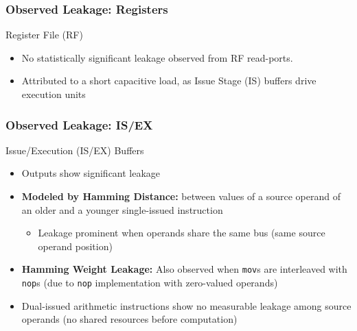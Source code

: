 \begin{frame}
    \frametitle{Observed Leakage: Registers}
    \begin{block}{Register File (RF)}
        \begin{itemize}
            \item No statistically significant leakage observed from RF read-ports.
            \item Attributed to a short capacitive load, as Issue Stage (IS) buffers drive execution units
        \end{itemize}
    \end{block}
\end{frame}

\begin{frame}
    \frametitle{Observed Leakage: IS/EX}
    \begin{block}{Issue/Execution (IS/EX) Buffers}
        \begin{itemize}
            \item Outputs show significant leakage
            \item \textbf{Modeled by Hamming Distance:} between values of a source operand of an older and a younger single-issued instruction
                \begin{itemize}
                    \item Leakage prominent when operands share the same bus (same source operand position)
                \end{itemize}
            \item \textbf{Hamming Weight Leakage:} Also observed when \texttt{mov}s are interleaved with \texttt{nop}s (due to \texttt{nop} implementation with zero-valued operands)
            \item Dual-issued arithmetic instructions show no measurable leakage among source operands (no shared resources before computation)
        \end{itemize}
    \end{block}
\end{frame}

